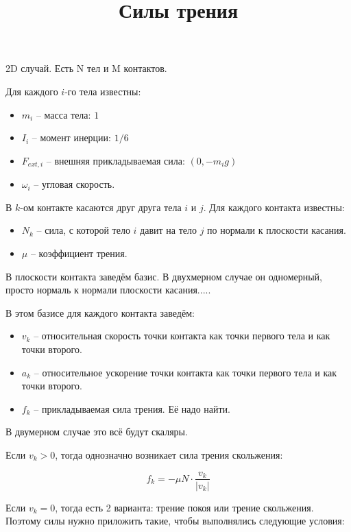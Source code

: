 \documentclass{article}
\title{Силы трения}
\begin{document}
\maketitle

2D случай. Есть N тел и M контактов.

Для каждого $i$-го тела известны:

\begin{itemize}
    \item $m_i$ -- масса тела: $1$
    \item $I_i$ -- момент инерции: $1/6$
    \item $F_{ext,i}$ -- внешняя прикладываемая сила: $(0, -m_i g)$
    \item $\omega_{i}$ -- угловая скорость.
\end{itemize}

В $k$-ом контакте касаются друг друга тела $i$ и $j$. Для каждого контакта известны:

\begin{itemize}
    \item $N_k$ -- сила, с которой тело $i$ давит на тело $j$ по нормали к плоскости касания. 
    \item $\mu$ -- коэффициент трения.
\end{itemize}

В плоскости контакта заведём базис. В двухмерном случае он одномерный, просто нормаль к нормали плоскости касания.....

В этом базисе для каждого контакта заведём:

\begin{itemize}
    \item $v_k$ -- относительная скорость точки контакта как точки первого тела и как точки второго.
    \item $a_k$ -- относительное ускорение точки контакта как точки первого тела и как точки второго.
    \item $f_k$ -- прикладываемая сила трения. Её надо найти.
\end{itemize}

В двумерном случае это всё будут скаляры.

Если $v_k > 0$, тогда однозначно возникает сила трения скольжения:

\[ f_k = -\mu N \cdot \frac{v_k}{|v_k|} \]

Если $v_k = 0$, тогда есть 2 варианта: трение покоя или трение скольжения.
Поэтому силы нужно приложить такие, чтобы выполнялись следующие условия:
\end{document}
